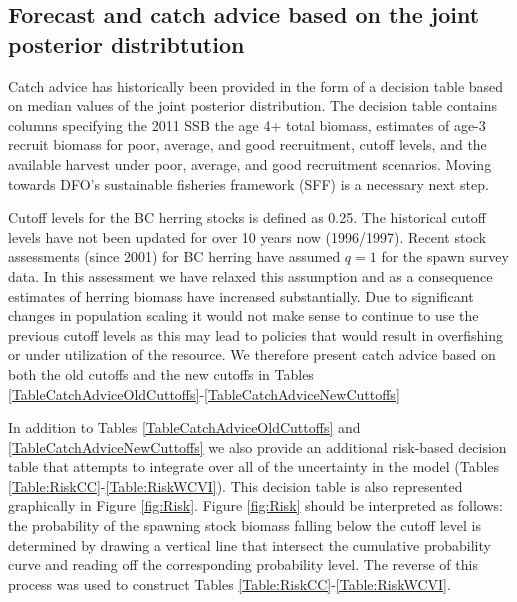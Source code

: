 
\subsection{Forecast and catch advice based on the joint posterior distribtution} \label{Section:Forecast}

Catch advice has historically been provided in the form of a decision table based on median values of the joint posterior distribution.  The decision table contains columns specifying the 2011 SSB the age 4+ total biomass, estimates of age-3 recruit biomass for poor, average, and good recruitment, cutoff levels, and the available harvest under poor, average, and good recruitment scenarios.  Moving towards DFO's sustainable fisheries framework  (SFF) is a necessary next step.

Cutoff levels for the BC herring stocks is defined as 0.25\bo. The historical cutoff levels have not been updated for over 10 years now (1996/1997).  Recent stock assessments (since 2001) for BC herring have assumed $q=1$ for the spawn survey data.  In this assessment we have relaxed this assumption and as a consequence estimates of herring biomass have increased substantially.  Due to significant changes in population scaling it would not make sense to continue to use the previous cutoff levels as this may lead to policies that would result in overfishing or under utilization of the resource.  We therefore present catch advice based on both the old cutoffs and the new cutoffs in Tables \ref{TableCatchAdviceOldCuttoffs}-\ref{TableCatchAdviceNewCuttoffs} 






In addition to Tables \ref{TableCatchAdviceOldCuttoffs} and \ref{TableCatchAdviceNewCuttoffs} we also provide an additional risk-based decision table that attempts to integrate over all of the uncertainty in the model (Tables \ref{Table:RiskCC}-\ref{Table:RiskWCVI}).  This decision table is also represented graphically in Figure \ref{fig:Risk}.  Figure \ref{fig:Risk} should be interpreted as follows: the probability of the spawning stock biomass falling below the cutoff level is determined by drawing a vertical line that intersect the cumulative probability curve and reading off the corresponding probability level. The reverse of this process was used to construct Tables \ref{Table:RiskCC}-\ref{Table:RiskWCVI}.
\clearpage







